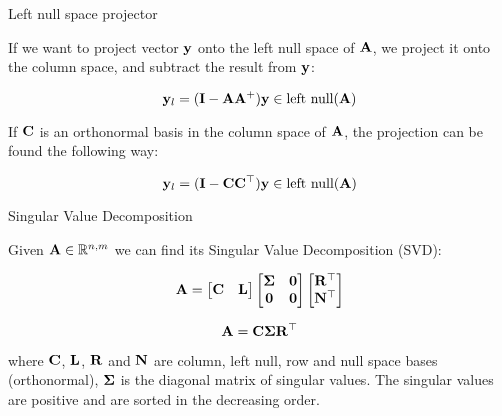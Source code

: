 \documentclass{beamer}
\begin{document}
\begin{frame}{Left null space projector}
	\begin{flushleft}
		
		If we want to project vector $\mathbf{y}$ onto the left null space of $\mathbf{A}$, we project it onto the column space, and subtract the result from $\mathbf{y}$:
		
		\begin{equation}
			\mathbf{y}_l = (\mathbf{I} - \mathbf{A}\mathbf{A}^+) \mathbf{y} \in \text{left null}(\mathbf{A})
		\end{equation}
		
		If $\mathbf{C}$ is an orthonormal basis in the column space of $\mathbf{A}$, the projection can be found the following way:
		
		\begin{equation}
			\mathbf{y}_l = (\mathbf{I} - \mathbf{C}\mathbf{C}^\top) \mathbf{y} \in \text{left null}(\mathbf{A})
		\end{equation}
		
		
	\end{flushleft}
\end{frame}



\begin{frame}{Singular Value Decomposition}
	\begin{flushleft}
		
		Given $\mathbf{A} \in \mathbb{R}^{n, m}$ we can find its Singular Value Decomposition (SVD):
		
		\begin{equation}
			\mathbf{A} = 
			\begin{bmatrix}
				\mathbf{C} & \mathbf{L}
			\end{bmatrix}
			\begin{bmatrix}
				\mathbf{\Sigma} & \mathbf{0} \\
				\mathbf{0} & \mathbf{0}
			\end{bmatrix}
			\begin{bmatrix}
				\mathbf{R}^\top \\ \mathbf{N}^\top
			\end{bmatrix}
		\end{equation}
		
		\begin{equation}
			\mathbf{A} = 
			\mathbf{C} \mathbf{\Sigma} \mathbf{R}^\top
		\end{equation}
		
		where $\mathbf{C}$, $\mathbf{L}$, $\mathbf{R}$ and $\mathbf{N}$ are column, left null, row and null space bases (orthonormal), $\mathbf{\Sigma}$ is the diagonal matrix of singular values. The singular values are positive and are sorted in the decreasing order.
		
		
	\end{flushleft}
\end{frame}
\end{document}
